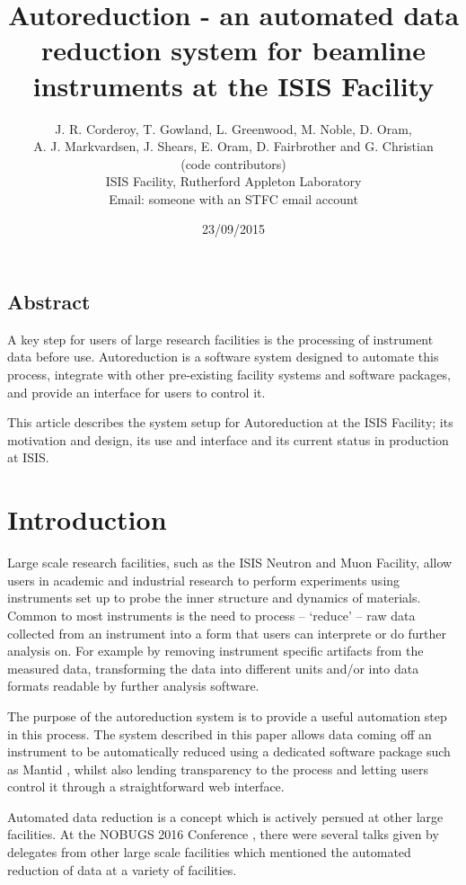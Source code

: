 \documentclass[twocolumn]{article}
\title{\textbf{Autoreduction - an automated data reduction system for beamline instruments at the ISIS Facility}}
\author{J. R. Corderoy, T. Gowland, L. Greenwood, M. Noble, D. Oram, \\
	A. J. Markvardsen, J. Shears, E. Oram, D. Fairbrother and G. Christian \\
(code contributors)\\
ISIS Facility, Rutherford Appleton Laboratory\\
Email: someone with an STFC email account}
\date{23/09/2015}
\begin{document}
\maketitle

\subsection*{Abstract}\label{abstract}

A key step for users of large research facilities is the
processing of instrument data before use. Autoreduction is a software
system designed to automate this process, integrate with other
pre-existing facility systems and software packages, and provide
an interface for users to control it.

This article describes the system setup for Autoreduction at the ISIS Facility;
its motivation and design, its use and interface and its current status in production at ISIS.

\section{Introduction}\label{introduction}

Large scale research facilities, such as the ISIS Neutron and Muon
Facility, allow users in academic and industrial research
to perform experiments using instruments set up to probe the inner 
structure and dynamics of materials. 
Common to most instruments is the need to process -- 
`reduce' -- raw data collected from an instrument into a form
that users can interprete or do further analysis on. For example
by removing instrument specific artifacts from the measured data, 
transforming the data into different units and/or
into data formats readable by further analysis software.

The purpose of the autoreduction system is to provide a useful automation
step in this process. The system described in this paper allows data coming 
off an instrument to be automatically reduced using a dedicated software package 
such as Mantid \cite{mantid}, whilst also lending transparency to the process and
letting users control it through a straightforward web interface.

Automated data reduction is a concept which is actively persued at other large facilities.
At the NOBUGS 2016 Conference \cite{NOBUGS}, there were several talks given by delegates
from other large scale facilities which mentioned the automated reduction of data at a variety
of facilities. 
\end{document}
